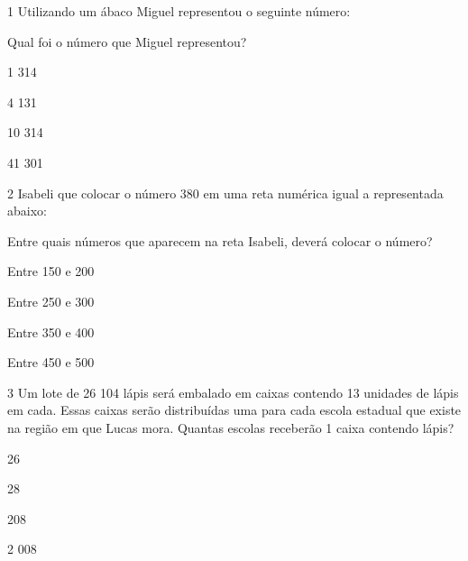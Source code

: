 \num{1} Utilizando um ábaco Miguel representou o seguinte número:


Qual foi o número que Miguel representou?

\begin{escolha}
\item
  1 314
\item
  4 131
\item
  10 314
\item
  41 301
\end{escolha}


\num{2} Isabeli que colocar o número 380 em uma reta numérica igual a
representada abaixo:


Entre quais números que aparecem na reta Isabeli, deverá colocar o
número?

\begin{escolha}
\item
  Entre 150 e 200
\item
  Entre 250 e 300
\item
  Entre 350 e 400
\item
  Entre 450 e 500
\end{escolha}


\num{3} Um lote de 26 104 lápis será embalado em caixas contendo 13
unidades de lápis em cada. Essas caixas serão distribuídas uma para cada
escola estadual que existe na região em que Lucas mora. Quantas escolas
receberão 1 caixa contendo lápis?

\begin{escolha}
\item
  26
\item
  28
\item
  208
\item
  2 008
\end{escolha}

